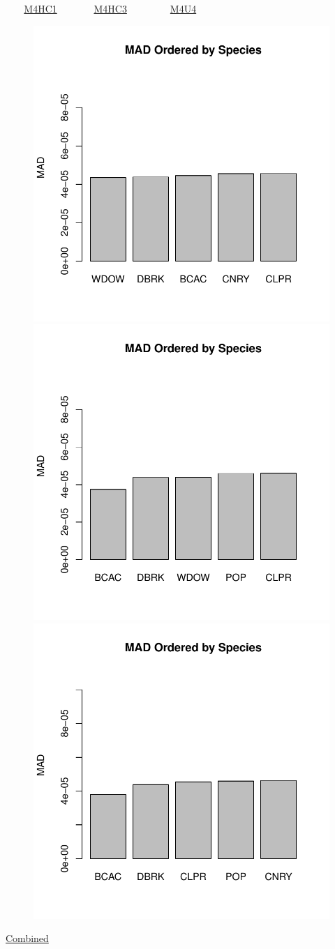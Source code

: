 \documentclass[ xcolor = pdftex, dvipsnames, table ]{beamer}
\begin{document}
\begin{frame}{$~~~~~~~$ \href{https://github.com/gasduster99/sppComp/tree/master/sscRuns/25019781982M4HC1}{M4HC1} $~~~~~~~~~~~~~~$ \href{https://github.com/gasduster99/sppComp/tree/master/sscRuns/25019781982M4HC3}{M4HC3} $~~~~~~~~~~~~~~~~~$ \href{https://github.com/gasduster99/sppComp/tree/master/sscRuns/25019781982M4U4}{M4U4} }
        \begin{figure}[ht!]
        \centering
        \hspace*{-1cm}
        \includegraphics[width=.4\textwidth]{../sscRuns/25019781982M4HC1/sppHeadMad68.pdf}
        \includegraphics[width=.4\textwidth]{../sscRuns/25019781982M4HC3/sppHeadMad68.pdf}
        \includegraphics[width=.4\textwidth]{../sscRuns/25019781982M4U4/sppHeadMad68.pdf}
        \end{figure}
	\vspace{-1cm}
	\begin{center}
	\Large
	\href{https://github.com/gasduster99/sppComp/tree/master/try1/postSSC/25019781982M4HC1HC3U4}{Combined}
	\end{center}
\end{frame}
\end{document}
